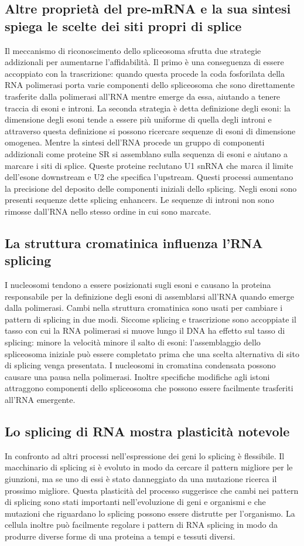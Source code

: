 \subsection{Altre propriet\`a del pre-mRNA e la sua sintesi spiega le scelte dei siti propri di splice}
Il meccanismo di riconoscimento dello spliceosoma sfrutta due strategie addizionali per aumentarne l'affidabilit\`a. Il primo \`e una conseguenza di essere accoppiato con la 
trascrizione: quando questa procede la coda fosforilata della RNA polimerasi porta varie componenti dello spliceosoma che sono direttamente trasferite dalla polimerasi all'RNA mentre 
emerge da essa, aiutando a tenere traccia di esoni e introni. La seconda strategia \`e detta definizione degli esoni: la dimensione degli esoni tende a essere pi\`u uniforme di quella
degli introni e attraverso questa definizione si possono ricercare sequenze di esoni di dimensione omogenea. Mentre la sintesi dell'RNA procede un gruppo di componenti addizionali come 
proteine SR si assemblano sulla sequenza di esoni e aiutano a marcare i siti di splice. Queste proteine reclutano U1 snRNA che marca il limite dell'esone downstream e U2 che specifica
l'upstream. Questi processi aumentano la precisione del deposito delle componenti iniziali dello splicing. Negli esoni sono presenti sequenze dette splicing enhancers. Le sequenze di
introni non sono rimosse dall'RNA nello stesso ordine in cui sono marcate. 
\subsection{La struttura cromatinica influenza l'RNA splicing}
I nucleosomi tendono a essere posizionati sugli esoni e causano la proteina responsabile per la definizione degli esoni di assemblarsi all'RNA quando emerge dalla polimerasi. Cambi 
nella struttura cromatinica sono usati per cambiare i pattern di splicing in due modi. Siccome splicing e trascrizione sono accoppiate il tasso con cui la RNA polimerasi si muove 
lungo il DNA ha effetto sul tasso di splicing: minore la velocit\`a minore il salto di esoni: l'assemblaggio dello spliceosoma iniziale pu\`o essere completato prima che una scelta 
alternativa di sito di splicing venga presentata. I nucleosomi in cromatina condensata possono causare una pausa nella polimerasi. Inoltre specifiche modifiche agli istoni attraggono 
componenti dello spliceosoma che possono essere facilmente trasferiti all'RNA emergente. 
\subsection{Lo splicing di RNA mostra plasticit\`a notevole}
In confronto ad altri processi nell'espressione dei geni lo splicing \`e flessibile. Il macchinario di splicing si \`e evoluto in modo da cercare il pattern migliore per le giunzioni, ma
se uno di essi \`e stato danneggiato da una mutazione ricerca il prossimo migliore. Questa plasticit\`a del processo suggerisce che cambi nei pattern di splicing sono stati importanti
nell'evoluzione di geni e organismi e che mutazioni che riguardano lo splicing possono essere distrutte per l'organismo. La cellula inoltre pu\`o facilmente regolare i pattern di RNA
splicing in modo da produrre diverse forme di una proteina a tempi e tessuti diversi. 

